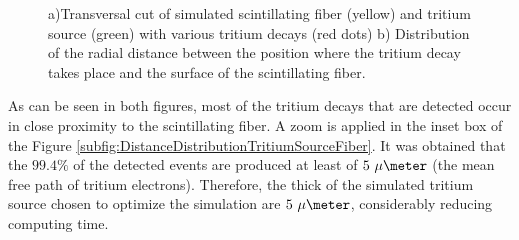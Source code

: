 \begin{figure}[h]
 \centering
 \caption{a)Transversal cut of simulated scintillating fiber (yellow) and tritium source (green) with various tritium decays (red dots) b) Distribution of the radial distance between the position where the tritium decay takes place and the surface of the scintillating fiber.}
 \label{fig:TritiumSourceSimulated}
\end{figure}	

As can be seen in both figures, most of the tritium decays that are detected occur in close proximity to the scintillating fiber.  A zoom is applied in the inset box of the Figure \ref{subfig:DistanceDistributionTritiumSourceFiber}. It was obtained that the $99.4\%$ of the detected events are produced at least of $5~\mu\meter$ (the mean free path of tritium electrons). Therefore, the thick of the simulated tritium source chosen to optimize the simulation are $5~\mu\meter$, considerably reducing computing time. 

